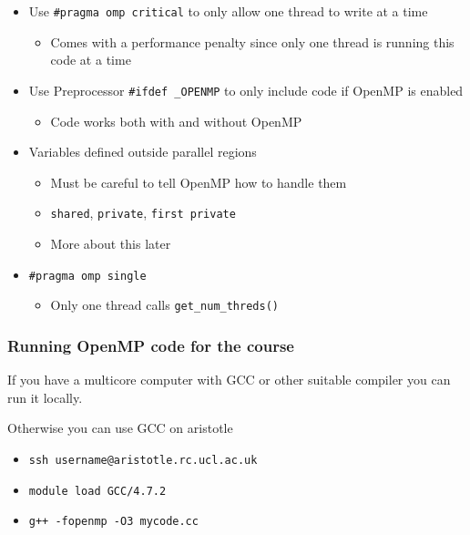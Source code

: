 \begin{itemize}
\itemsep1pt\parskip0pt
\item
  Use \texttt{\#pragma omp critical} to only allow one thread to write
  at a time

  \begin{itemize}
  \itemsep1pt\parskip0pt
  \item
    Comes with a performance penalty since only one thread is running
    this code at a time
  \end{itemize}
\item
  Use Preprocessor \texttt{\#ifdef \_OPENMP} to only include code if
  OpenMP is enabled

  \begin{itemize}
  \itemsep1pt\parskip0pt
  \item
    Code works both with and without OpenMP
  \end{itemize}
\item
  Variables defined outside parallel regions

  \begin{itemize}
  \itemsep1pt\parskip0pt
  \item
    Must be careful to tell OpenMP how to handle them
  \item
    \texttt{shared}, \texttt{private}, \texttt{first private}
  \item
    More about this later
  \end{itemize}
\item
  \texttt{\#pragma omp single}

  \begin{itemize}
  \itemsep1pt\parskip0pt
  \item
    Only one thread calls \texttt{get\_num\_threds()}
  \end{itemize}
\end{itemize}

\subsubsection{Running OpenMP code for the
course}\label{running-openmp-code-for-the-course}

If you have a multicore computer with GCC or other suitable compiler you
can run it locally.

Otherwise you can use GCC on aristotle

\begin{itemize}
\itemsep1pt\parskip0pt
\item
  \texttt{ssh username@aristotle.rc.ucl.ac.uk}
\item
  \texttt{module load GCC/4.7.2}
\item
  \texttt{g++ -fopenmp -O3 mycode.cc}
\end{itemize}

